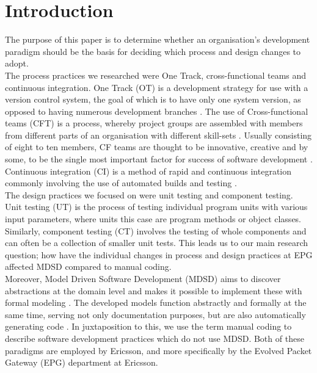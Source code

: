 \documentclass[fina_report_innit.tex]{subfiles}
\begin{document}
\section{Introduction}

The purpose of this paper is to determine whether an organisation's development paradigm should be the basis for deciding which process and design changes to adopt. 
\\

The process practices we researched were One Track, cross-functional teams and continuous integration. One Track (OT) is a development strategy for use with a version control system, the goal of which is to have only one system version, as opposed to having numerous development branches \cite{hribar2008first}. The use of Cross-functional teams (CFT) is a process, whereby project groups are assembled with members from different parts of an organisation with different skill-sets \cite{henke1993perspective}\cite{ghobadi2011challenges}. Usually consisting of eight to ten members, CF teams are thought to be innovative, creative \cite{ghobadi2011challenges} and by some, to be the single most important factor for success of software development \cite{marchwinski2000technical}. Continuous integration (CI) is a method of rapid and continuous integration commonly involving the use of automated builds and testing \cite{sommerville10software}.  
\\

The design practices we focused on were unit testing and component testing. Unit testing (UT) is the process of testing individual program units with various input parameters, where units this case are program methods or object classes. Similarly, component testing (CT) involves the testing of whole components and can often be a collection of smaller unit tests. This leads us to our main research question; how have the individual changes in process and design practices at EPG affected MDSD compared to manual coding.
\\

Moreover, Model Driven Software Development (MDSD) aims to discover abstractions at the domain level and makes it possible to implement these with formal modeling \cite{stahl2006model}. The developed models function abstractly and formally at the same time, serving not only documentation purposes, but are also automatically generating code \cite{stahl2006model}. In juxtaposition to this, we use the term manual coding to describe software development practices which do not use MDSD. Both of these paradigms are employed by Ericsson, and more specifically by the Evolved Packet Gateway (EPG) department at Ericsson.
\\
\end{document}
